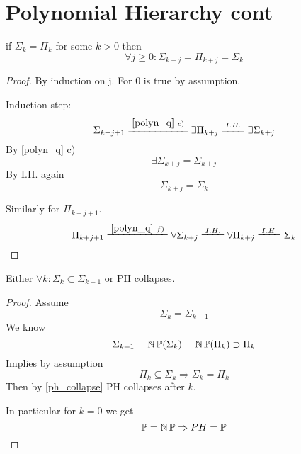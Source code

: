 \section{\texorpdfstring{Polynomial Hierarchy cont}{Polynomial Hierarchy cont}}
\vspace{5mm}
\large



\begin{consequence}\label{ph_collapse}
	if $\Sigma_k = \Pi_k$ for some $k > 0$ then
	\[ \forall j \geq 0: \Sigma_{k + j} = \Pi_{k + j} = \Sigma_k \]
\end{consequence}
\begin{proof}
	By induction on j. For 0 is true by assumption.

	Induction step:
	\[ \Sigma_{k + j + 1} \xlongequal{\cref{polyn_q}\ c)} \exists \Pi_{k + j} \xlongequal{I.H.} \exists \Sigma_{k + j} \]
	By \cref{polyn_q} c)
	\[ \exists \Sigma_{k + j} = \Sigma_{k + j} \]
	By I.H. again
	\[ \Sigma_{k + j} = \Sigma_k \]

	Similarly for $\Pi_{k + j + 1}$.
	\[ \Pi_{k + j + 1} \xlongequal{\cref{polyn_q}\ f)} \forall \Sigma_{k + j} \xlongequal{I.H.} \forall \Pi_{k + j} \xlongequal{I.H.} \Sigma_k \]
\end{proof}

\begin{consequence}
	Either $\forall k: \Sigma_k \subset \Sigma_{k + 1}$ or PH collapses.
\end{consequence}
\begin{proof}
	Assume
	\[ \Sigma_k = \Sigma_{k + 1} \]
	We know
	\[ \Sigma_{k + 1} = \operatorname{\operatorname{\mathbb{N}}\mathbb{P}}(\Sigma_{k}) = \operatorname{\operatorname{\mathbb{N}}\mathbb{P}}(\Pi_k) \supset \Pi_k \]
	Implies by assumption
	\[ \Pi_k \subseteq \Sigma_k \Rightarrow \Sigma_k = \Pi_k \]
	Then by \cref{ph_collapse} PH collapses after $k$.

	In particular for $k = 0$ we get
	\[ \operatorname{\mathbb{P}} = \operatorname{\operatorname{\mathbb{N}}\mathbb{P}} \Rightarrow PH = \operatorname{\mathbb{P}} \]
\end{proof}

